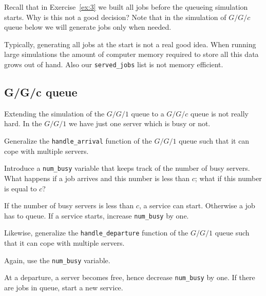 \documentclass{scrartcl}
\begin{document}
\begin{exercise}
  Recall that in Exercise~\ref{ex:3} we built all jobs before the queueing simulation starts. Why is this not a good decision? Note that in the simulation of $G/G/c$ queue below we will generate jobs only when needed. 
  \begin{solution}
    Typically, generating all jobs at the start is not a real good idea. When running large simulations the amount of computer memory required to store all this data grows out of hand. Also our \texttt{served\_jobs} list is not memory efficient. 
  \end{solution}
\end{exercise}

\subsection{G/G/c queue}

\label{sec:ggc-queue}

Extending the simulation of the $G/G/1$ queue to a $G/G/c$ queue is not really hard. In the $G/G/1$ we have just one server which is busy or not.

\begin{exercise}
  Generalize  the \texttt{handle\_arrival} function of the $G/G/1$ queue such that it can cope with multiple servers.

  \hintsymbol\begin{hint}
  Introduce a \texttt{num\_busy} variable that keeps track of the number of busy servers. What happens if a job arrives and this number is less than $c$; what if this number is equal to $c$?
  \end{hint}
  \begin{solution}
    If the number of busy servers is less than $c$, a service can start. Otherwise a job has to queue. If a service starts, increase \texttt{num\_busy} by one. 
  \end{solution}
\end{exercise}


\begin{exercise}
Likewise,   generalize  the \texttt{handle\_departure} function of the $G/G/1$ queue such that it can cope with multiple servers.
\hintsymbol\begin{hint}
  Again, use the \texttt{num\_busy} variable. 
\end{hint}

\begin{solution}
  At a departure, a server becomes free, hence decrease \texttt{num\_busy} by one. If there are jobs in queue, start a new service.
\end{solution}
\end{exercise}
\end{document}
